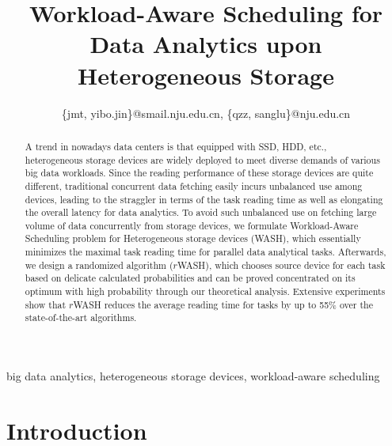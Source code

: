 \documentclass[conference]{IEEEtran}
\begin{document}
\title{Workload-Aware Scheduling for Data Analytics upon Heterogeneous Storage}

\author{
\{jmt, yibo.jin\}@smail.nju.edu.cn, \{qzz, sanglu\}@nju.edu.cn}


\maketitle
\begin{abstract}
A trend in nowadays data centers is that equipped with SSD, HDD, etc., heterogeneous storage devices are widely deployed to meet diverse demands of various big data workloads. 
Since the reading performance of these storage devices are quite different, traditional concurrent data fetching easily incurs unbalanced use among devices, leading to the straggler in terms of the task reading time as well as elongating the overall latency for data analytics.
To avoid such unbalanced use on fetching large volume of data concurrently from storage devices, we formulate Workload-Aware Scheduling problem for Heterogeneous storage devices (WASH), which essentially minimizes the maximal task reading time for parallel data analytical tasks. Afterwards, we design a randomized algorithm ($r$WASH), which chooses source device for each task based on delicate calculated probabilities and can be proved concentrated on its optimum with high probability through our theoretical analysis. Extensive experiments show that $r$WASH reduces the average reading time for tasks by up to 55\% over the state-of-the-art algorithms.

\end{abstract}

\begin{IEEEkeywords}
big data analytics, heterogeneous storage devices, workload-aware scheduling
\end{IEEEkeywords}

\section{Introduction}
\end{document}
